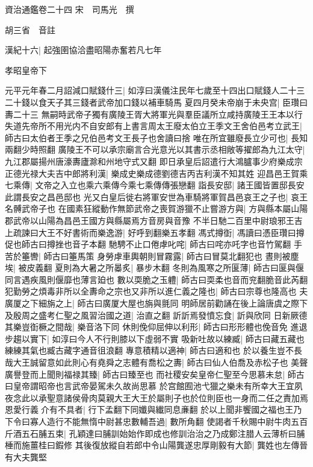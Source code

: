 資治通鑑卷二十四
宋　司馬光　撰

胡三省　音註

漢紀十六|{
	起強圉協洽盡昭陽赤奮若凡七年}


孝昭皇帝下

元平元年春二月詔減口賦錢什三|{
	如淳曰漢儀注民年七歲至十四出口賦錢人二十三二十錢以食天子其三錢者武帝加口錢以補車騎馬}
夏四月癸未帝崩于未央宫|{
	臣瓚曰夀二十三}
無嗣時武帝子獨有廣陵王胥大將軍光與羣臣議所立咸持廣陵王王本以行失道先帝所不用光内不自安郎有上書言周太王廢太伯立王季文王舍伯邑考立武王|{
	師古曰太伯者王季之兄伯邑考文王長子也舍讀曰捨}
唯在所宜雖廢長立少可也|{
	長知兩翻少時照翻}
廣陵王不可以承宗廟言合光意光以其書示丞相敞等擢郎為九江太守|{
	九江郡屬揚州唐濠夀廬滁和州地守式又翻}
即日承皇后詔遣行大鴻臚事少府樂成宗正德光禄大夫吉中郎將利漢|{
	樂成史樂成德劉德吉丙吉利漢不知其姓}
迎昌邑王賀乘七乘傳|{
	文帝之入立也乘六乘傳今乘七乘傳傳張戀翻}
詣長安邸|{
	諸王國皆置邸長安此謂長安之昌邑邸也}
光又白皇后徙右將軍安世為車騎將軍賀昌邑哀王之子也|{
	哀王名髆武帝子也}
在國素狂縱動作無節武帝之喪賀游獵不止嘗游方與|{
	方與縣本屬山陽郡武帝以山陽為昌邑王國方與縣屬焉方音房與音豫}
不半日馳二百里中尉琅邪王吉上疏諫曰大王不好書術而樂逸游|{
	好呼到翻樂五孝翻}
馮式撙衘|{
	馮讀曰憑臣瓚曰撙促也師古曰撙挫也音子本翻}
馳騁不止口倦虖叱咤|{
	師古曰咤亦吒字也音竹駕翻}
手苦於箠轡|{
	師古曰箠馬策}
身勞虖車輿朝則冒霧露|{
	師古曰冒莫北翻犯也}
晝則被塵埃|{
	被皮義翻}
夏則為大暑之所㬥炙|{
	暴步木翻}
冬則為風寒之所匽薄|{
	師古曰匽與偃同言遇疾風則偃靡也薄言廹也}
數以耎脆之玉軆|{
	師古曰耎柔也音而兖翻脆音此芮翻}
犯勤勞之煩毒非所以全夀命之宗也又非所以進仁義之隆也|{
	師古曰宗尊也隆高也}
夫廣厦之下細旃之上|{
	師古曰廣厦大屋也旃與氈同}
明師居前勸誦在後上論唐虞之際下及殷周之盛考仁聖之風習治國之道|{
	治直之翻}
訢訢焉發憤忘食|{
	訢與欣同}
日新厥德其樂豈衘橛之間哉|{
	樂音洛下同}
休則俛仰屈伸以利形|{
	師古曰形形體也俛音免}
進退步趨以實下|{
	如淳曰今人不行則膝以下虛弱不實}
吸新吐故以練臧|{
	師古曰藏五藏也練練其氣也臧古藏字通音徂浪翻}
專意積精以適神|{
	師古曰適和也}
於以養生豈不長哉大王誠留意如此則心有堯舜之志體有喬松之夀|{
	師古曰仙人伯喬及赤松子也}
美聲廣譽登而上聞則福禄其臻|{
	師古曰臻至也}
而社稷安矣皇帝仁聖至今思慕未怠|{
	師古曰皇帝謂昭帝也言武帝晏駕未久故尚思慕}
於宫館囿池弋獵之樂未有所幸大王宜夙夜念此以承聖意諸侯骨肉莫親大王大王於屬則子也於位則臣也一身而二任之責加焉恩愛行義介有不具者|{
	行下孟翻下同孅與纎同息亷翻}
於以上聞非饗國之福也王乃下令曰寡人造行不能無惰中尉甚忠數輔吾過|{
	數所角翻}
使謁者千秋賜中尉牛肉五百斤酒五石脯五束|{
	孔穎達曰脯訓始始作即成也修訓治治之乃成鄭注腊人云薄析曰脯棰而施薑桂曰鍜修}
其後復放縱自若郎中令山陽龔遂忠厚剛毅有大節|{
	龔姓也左傳晉有大夫龔堅}
